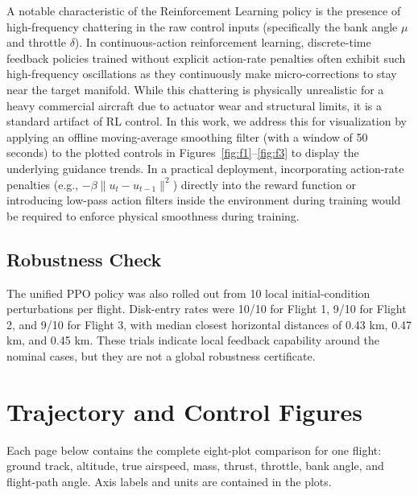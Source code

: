 \documentclass[11pt,a4paper]{article}
\begin{document}
A notable characteristic of the Reinforcement Learning policy is the presence of high-frequency chattering in the raw control inputs (specifically the bank angle $\mu$ and throttle $\delta$). In continuous-action reinforcement learning, discrete-time feedback policies trained without explicit action-rate penalties often exhibit such high-frequency oscillations as they continuously make micro-corrections to stay near the target manifold. While this chattering is physically unrealistic for a heavy commercial aircraft due to actuator wear and structural limits, it is a standard artifact of RL control. In this work, we address this for visualization by applying an offline moving-average smoothing filter (with a window of 50 seconds) to the plotted controls in Figures~\ref{fig:f1}--\ref{fig:f3} to display the underlying guidance trends. In a practical deployment, incorporating action-rate penalties (e.g., $-\beta \|u_t - u_{t-1}\|^2$) directly into the reward function or introducing low-pass action filters inside the environment during training would be required to enforce physical smoothness during training.

\subsection{Robustness Check}
The unified PPO policy was also rolled out from 10 local
initial-condition perturbations per flight. Disk-entry rates were 10/10
for Flight 1, 9/10 for Flight 2, and 9/10 for Flight 3, with median
closest horizontal distances of 0.43 km, 0.47 km, and 0.45 km. These
trials indicate local feedback capability around the nominal cases, but
they are not a global robustness certificate.

\clearpage
\section{Trajectory and Control Figures}
Each page below contains the complete eight-plot comparison
for one flight: ground track, altitude, true airspeed, mass, thrust,
throttle, bank angle, and flight-path angle. Axis labels and units are
contained in the plots.
\end{document}
